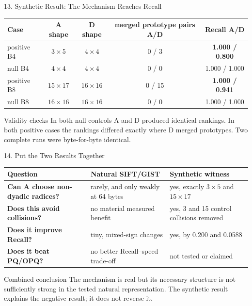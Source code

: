 \documentclass[aspectratio=169]{beamer}
\newcommand{\good}[1]{\textcolor{green!45!black}{\textbf{#1}}}
\begin{document}
\begin{frame}{13. Synthetic Result: The Mechanism Reaches Recall}
\small
\begin{center}
\begin{tabular}{lcccc}
\toprule
Case & A shape & D shape & merged prototype pairs A/D & Recall A/D\\
\midrule
positive B4 & \(3\times5\) & \(4\times4\) & 0 / 3 & \good{1.000 / 0.800}\\
null B4 & \(4\times4\) & \(4\times4\) & 0 / 0 & 1.000 / 1.000\\
positive B8 & \(15\times17\) & \(16\times16\) & 0 / 15 & \good{1.000 / 0.941}\\
null B8 & \(16\times16\) & \(16\times16\) & 0 / 0 & 1.000 / 1.000\\
\bottomrule
\end{tabular}
\end{center}
\begin{block}{Validity checks}
In both null controls A and D produced identical rankings. In both positive
cases the rankings differed exactly where D merged prototypes. Two complete
runs were byte-for-byte identical.
\end{block}
\end{frame}

\begin{frame}{14. Put the Two Results Together}
\begin{center}
\begin{tabularx}{0.94\textwidth}{>{\bfseries}p{} X X}
\toprule
Question & Natural SIFT/GIST & Synthetic witness\\
\midrule
Can A choose non-dyadic radices? & rarely, and only weakly at 64 bytes & yes,
exactly \(3\times5\) and \(15\times17\)\\
Does this avoid collisions? & no material measured benefit & yes, 3 and 15
control collisions removed\\
Does it improve Recall? & tiny, mixed-sign changes & yes, by 0.200 and 0.0588\\
Does it beat PQ/OPQ? & no better Recall--speed trade-off & not tested or claimed\\
\bottomrule
\end{tabularx}
\end{center}
\begin{alertblock}{Combined conclusion}
The mechanism is real but its necessary structure is not sufficiently strong
in the tested natural representation. The synthetic result explains the
negative result; it does not reverse it.
\end{alertblock}
\end{frame}
\end{document}
